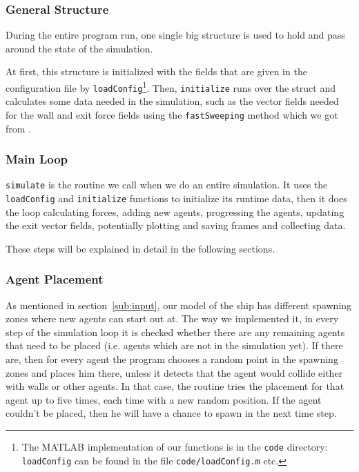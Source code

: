\documentclass[11pt]{article}
\begin{document}
\subsubsection{General Structure}

\label{sub:structure}

During the entire program run, one single big structure is used to hold and
pass around the state of the simulation.

At first, this structure is initialized with the fields that are given in the
configuration file by \texttt{loadConfig}\footnote{The MATLAB implementation of
our functions is in the \texttt{code} directory: \texttt{loadConfig} can be
found in the file \texttt{code/loadConfig.m} etc.}.  Then, \texttt{initialize} runs
over the struct and calculates some data needed in the simulation, such as the
vector fields needed for the wall and exit force fields using the
\texttt{fastSweeping} method which we got from \cite{multilevel}.

\subsubsection{Main Loop}

\texttt{simulate} is the routine we call when we do an entire simulation.  It
uses the \texttt{loadConfig} and \texttt{initialize} functions to initialize
its runtime data, then it does the loop calculating forces, adding new agents,
progressing the agents, updating the exit vector fields, potentially plotting
and saving frames and collecting data.

These steps will be explained in detail in the following sections.

\subsubsection{Agent Placement}

As mentioned in section~\ref{sub:input}, our model of the ship has different
spawning zones where new agents can start out at.  The way we implemented it,
in every step of the simulation loop it is checked whether there are any
remaining agents that need to be placed (i.e. agents which are not in the
simulation yet).  If there are, then for every agent the program chooses a
random point in the spawning zones and places him there, unless it detects that
the agent would collide either with walls or other agents.  In that case, the
routine tries the placement for that agent up to five times, each time with a
new random position.  If the agent couldn't be placed, then he will have a
chance to spawn in the next time step.
\end{document}
